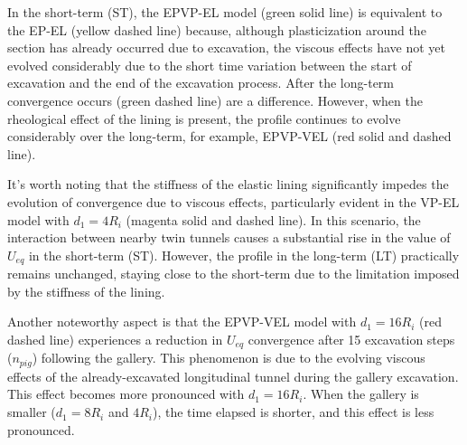 \documentclass[a4paper,fleqn]{cas-sc}
\begin{document}
In the short-term (ST), the EPVP-EL model (green solid line) is equivalent to the EP-EL (yellow dashed line) because, although plasticization around the section has already occurred due to excavation, the viscous effects have not yet evolved considerably due to the short time variation between the start of excavation and the end of the excavation process. After the long-term convergence occurs (green dashed line) are a difference. However, when the rheological effect of the lining is present, the profile continues to evolve considerably over the long-term, for example, EPVP-VEL (red solid and dashed line).

It's worth noting that the stiffness of the elastic lining significantly impedes the evolution of convergence due to viscous effects, particularly evident in the VP-EL model with $d_1=4R_i$ (magenta solid and dashed line). In this scenario, the interaction between nearby twin tunnels causes a substantial rise in the value of $U_{eq}$ in the short-term (ST). However, the profile in the long-term (LT) practically remains unchanged, staying close to the short-term due to the limitation imposed by the stiffness of the lining.

Another noteworthy aspect is that the EPVP-VEL model with $d_1 = 16R_i$ (red dashed line) experiences a reduction in $U_{eq}$ convergence after 15 excavation steps ($n_{pig}$) following the gallery. This phenomenon is due to the evolving viscous effects of the already-excavated longitudinal tunnel during the gallery excavation. This effect becomes more pronounced with $d_1 = 16R_i$. When the gallery is smaller ($d_1 = 8R_i$ and $4R_i$), the time elapsed is shorter, and this effect is less pronounced.
\end{document}
